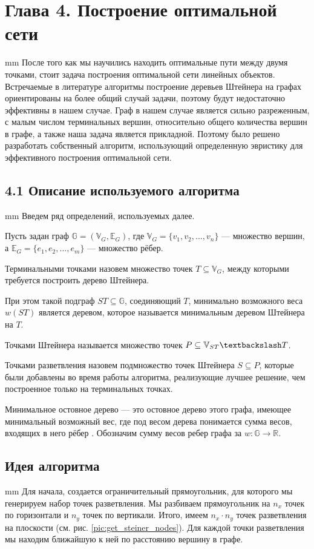\newpage
\section*{\LARGE{Глава 4. Построение оптимальной сети}}
 mm
После того как мы научились находить оптимальные пути между двумя точками, стоит задача построения оптимальной сети линейных объектов. Встречаемые в литературе алгоритмы построение деревьев Штейнера на графах ориентированы на более общий случай задачи, поэтому будут недостаточно эффективны в нашем случае. Граф в нашем случае является сильно разреженным, с малым числом терминальных вершин, относительно общего количества вершин в графе, а также наша задача является прикладной. Поэтому было решено разработать собственный алгоритм, использующий определенную эвристику для эффективного построения оптимальной сети.
\subsection*{\Large{4.1 Описание используемого алгоритма}}
 mm
Введем ряд определений, используемых далее.

Пусть задан граф $\mathbb{G} = (\mathbb{V}_G, \mathbb{E}_G)$, где $ \mathbb{V}_G = \{v_1, v_2, ..., v_n\}$ --- множество вершин, а $ \mathbb{E}_G = \{e_1, e_2, ..., e_m\}$ --- множество рёбер.

Терминальными точками назовем множество точек  $T \subseteq  \mathbb{V}_G$, между которыми требуется построить дерево Штейнера.

При этом такой подграф $ST \subseteq \mathbb{G}$, соединяющий $T$, минимально возможного веса $w(ST)$ является деревом, которое называется минимальным деревом Штейнера на $T$.

Точками Штейнера называется множество точек $P \subseteq \mathbb{V}_{ST} \textbackslash T$.

Точками разветвления назовем подмножество точек Штейнера $S \subseteq P$, которые были добавлены во время работы алгоритма, реализующие лучшее решение, чем построенное только на терминальных точках.

Минимальное остовное дерево --- это остовное дерево этого графа, имеющее минимальный возможный вес, где под весом дерева понимается сумма весов, входящих в него рёбер \cite{MST}. Обозначим сумму весов ребер графа за  
$w: \mathbb{G} \rightarrow \mathbb{R}$.
\subsection*{\Large{Идея алгоритма}}
 mm
Для начала, создается ограничительный прямоугольник, для которого мы генерируем набор точек разветвления. Мы разбиваем прямоугольник на $n_x$ точек по горизонтали и $n_y$ точек по вертикали. Итого, имеем $n_x \cdot n_y$  точек разветвления на плоскости (см. рис. \ref{pic:get_steiner_nodes}). Для каждой точки разветвления мы находим ближайшую к ней по расстоянию вершину в графе.

